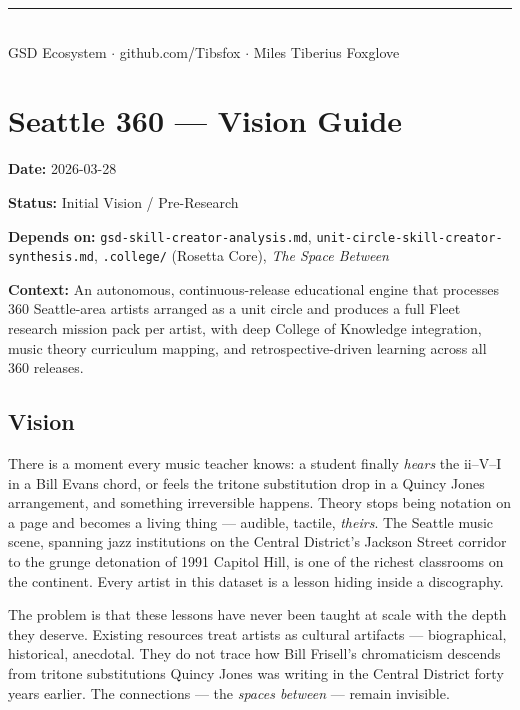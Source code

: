 \documentclass[11pt,letterpaper]{article}
\newcommand{\stageheader}[2]{%
  \noindent\colorbox{#2}{\makebox[\textwidth][l]{%
    \textcolor{white}{\bfseries\sffamily\large\hspace{8pt}#1\hspace{8pt}}}}%
  \vspace{0.6em}\par%
}
\newcommand{\metafield}[2]{\textbf{\sffamily\textcolor{primary}{#1}} \textcolor{darktext}{#2}\par}
\begin{document}
\begin{center}
\vspace{1.8cm}
\textcolor{bordergray}{\rule{9cm}{0.4pt}}\\[0.4em]
{\small\sffamily\textcolor{subtlegray}{GSD Ecosystem $\cdot$ github.com/Tibsfox $\cdot$ Miles Tiberius Foxglove}}
\end{center}
\newpage

\tableofcontents
\newpage

\stageheader{STAGE 1 \quad VISION DOCUMENT}{primary}

\section{Seattle 360 — Vision Guide}

\metafield{Date:}{2026-03-28}
\metafield{Status:}{Initial Vision / Pre-Research}
\metafield{Depends on:}{\texttt{gsd-skill-creator-analysis.md}, \texttt{unit-circle-skill-creator-synthesis.md}, \texttt{.college/} (Rosetta Core), \textit{The Space Between}}
\metafield{Context:}{An autonomous, continuous-release educational engine that processes 360 Seattle-area artists arranged as a unit circle and produces a full Fleet research mission pack per artist, with deep College of Knowledge integration, music theory curriculum mapping, and retrospective-driven learning across all 360 releases.}

\subsection{Vision}

There is a moment every music teacher knows: a student finally \textit{hears} the ii--V--I in a
Bill Evans chord, or feels the tritone substitution drop in a Quincy Jones arrangement,
and something irreversible happens. Theory stops being notation on a page and becomes a
living thing --- audible, tactile, \textit{theirs}. The Seattle music scene, spanning jazz
institutions on the Central District's Jackson Street corridor to the grunge detonation of
1991 Capitol Hill, is one of the richest classrooms on the continent. Every artist in
this dataset is a lesson hiding inside a discography.

The problem is that these lessons have never been taught at scale with the depth they
deserve. Existing resources treat artists as cultural artifacts --- biographical, historical,
anecdotal. They do not trace how Bill Frisell's chromaticism descends from tritone
substitutions Quincy Jones was writing in the Central District forty years earlier. The
connections --- the \textit{spaces between} --- remain invisible.
\end{document}
